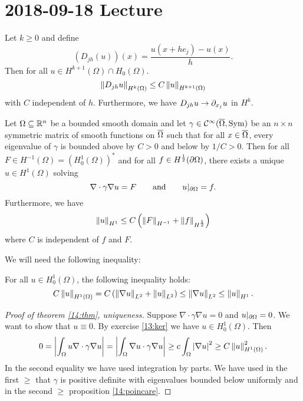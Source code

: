 \section{2018-09-18 Lecture}

\begin{exer}
  Let $k\geq0$ and define
  \[ \left(D_{jh}(u)\right)(x) = \frac{u(x+he_j)-u(x)}{h}. \]
  Then for all $u\in H^{k+1}(\Omega) \cap H_0(\Omega)$.
  \[ \left\lVert D_{jh}u \right\rVert_{H^k(\Omega)} \leq C\left\lVert u \right\rVert_{H^{k+1}(\Omega)} \]
  with $C$ independent of $h$.
  Furthermore, we have $D_{jh}u \to \partial_{x_j}u$ in $H^k$.
\end{exer}

\begin{thm}\label{14:thm}
  Let $\Omega\subseteq\mathbb{R}^n$ be a bounded smooth domain and let $\gamma\in\mathcal{C}^\infty(\overline\Omega,\operatorname{Sym})$ be an $n\times n$ symmetric matrix of smooth functions on $\overline\Omega$ such that for all $x\in\overline\Omega$, every eigenvalue of $\gamma$ is bounded above by $C>0$ and below by $1/C>0$.
  Then for all $F \in H^{-1}(\Omega)=(H_0^1(\Omega))^*$ and for all $f\in H^\frac12(\partial\Omega)$, there exists a unique $u\in H^1(\Omega)$ solving
  \[ \nabla\cdot\gamma\nabla u=F \qquad \text{and} \qquad u|_{\partial\Omega}=f. \]
  Furthermore, we have
  \[ \left\lVert u \right\rVert_{H^1} \leq C\left( \left\lVert F \right\rVert_{H^{-1}} + \left\lVert f \right\rVert_{H^\frac12} \right) \]
  where $C$ is independent of $f$ and $F$.
\end{thm}

We will need the following inequality:

\begin{prop}\label{14:poincare}
  For all $u \in H_0^1(\Omega)$, the following inequality holds:
  \[ C\left\lVert u \right\rVert_{H^1(\Omega)} = C\left( \left\lVert \nabla u \right\rVert_{L^2} + \left\lVert u \right\rVert_{L^2} \right) \leq \left\lVert \nabla u \right\rVert_{L^2} \leq \left\lVert u \right\rVert_{H^1}. \]
\end{prop}

\begin{proof}[Proof of theorem \ref{14:thm}, uniqueness]
  Suppose $\nabla\cdot\gamma\nabla u=0$ and $u|_{\partial\Omega}=0$.
  We want to show that $u\equiv0$.
  By exercise \ref{13:ker} we have $u \in H_0^1(\Omega)$.
  Then
  \[ 0 = \left\lvert \int_\Omega u \nabla\cdot\gamma\nabla u \right\rvert = \left\lvert \int_\Omega \nabla u\cdot\gamma\nabla u \right\rvert \geq c\int_\Omega\left\lvert \nabla u \right\rvert^2 \geq C\left\lVert u \right\rVert_{H^1(\Omega)}^2. \]
  In the second equality we have used integration by parts.
  We have used in the first $\geq$ that $\gamma$ is positive definite with eigenvalues bounded below uniformly and in the second $\geq$ proposition \ref{14:poincare}.
\end{proof}

